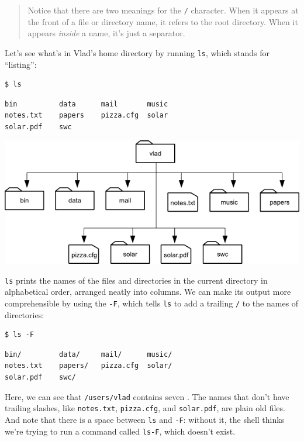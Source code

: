 \documentclass{book}
\begin{document}
\begin{quote}
Notice that there are two meanings for the \texttt{/} character. When it
appears at the front of a file or directory name, it refers to the root
directory. When it appears \emph{inside} a name, it's just a separator.
\end{quote}

Let's see what's in Vlad's home directory by running \texttt{ls}, which
stands for ``listing'':

\begin{verbatim}
$ ls
\end{verbatim}

\begin{verbatim}
bin          data      mail       music
notes.txt    papers    pizza.cfg  solar
solar.pdf    swc
\end{verbatim}

\includegraphics{novice/shell/img/vlad-homedir.png}

\texttt{ls} prints the names of the files and directories in the current
directory in alphabetical order, arranged neatly into columns. We can
make its output more comprehensible by using the
 \texttt{-F}, which tells
\texttt{ls} to add a trailing \texttt{/} to the names of directories:

\begin{verbatim}
$ ls -F
\end{verbatim}

\begin{verbatim}
bin/         data/     mail/      music/
notes.txt    papers/   pizza.cfg  solar/
solar.pdf    swc/
\end{verbatim}

Here, we can see that \texttt{/users/vlad} contains seven
. The names that don't have
trailing slashes, like \texttt{notes.txt}, \texttt{pizza.cfg}, and
\texttt{solar.pdf}, are plain old files. And note that there is a space
between \texttt{ls} and \texttt{-F}: without it, the shell thinks we're
trying to run a command called \texttt{ls-F}, which doesn't exist.
\end{document}
